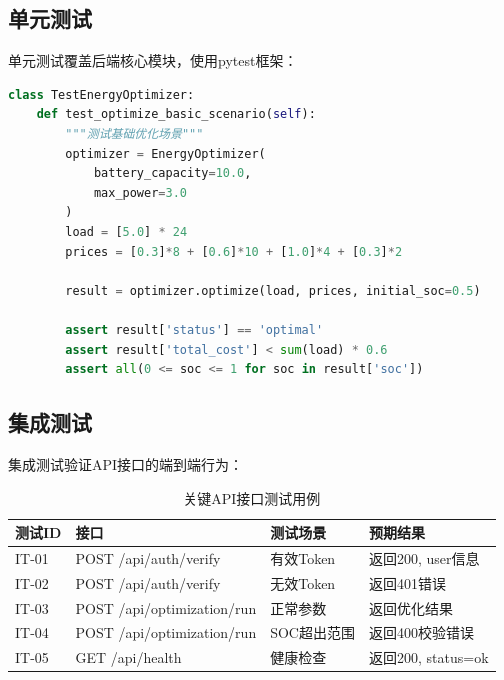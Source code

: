 \subsection{单元测试}

单元测试覆盖后端核心模块，使用pytest框架：

\begin{lstlisting}[language=Python, caption=单元测试示例]
class TestEnergyOptimizer:
    def test_optimize_basic_scenario(self):
        """测试基础优化场景"""
        optimizer = EnergyOptimizer(
            battery_capacity=10.0,
            max_power=3.0
        )
        load = [5.0] * 24
        prices = [0.3]*8 + [0.6]*10 + [1.0]*4 + [0.3]*2
        
        result = optimizer.optimize(load, prices, initial_soc=0.5)
        
        assert result['status'] == 'optimal'
        assert result['total_cost'] < sum(load) * 0.6
        assert all(0 <= soc <= 1 for soc in result['soc'])
\end{lstlisting}

\subsection{集成测试}

集成测试验证API接口的端到端行为：

\begin{table}[H]
    \centering
    \caption{关键API接口测试用例}
    \label{tab:api_tests}
    \begin{tabularx}{\textwidth}{l l l X}
        \toprule
        \textbf{测试ID} & \textbf{接口}                & \textbf{测试场景} & \textbf{预期结果}    \\
        \midrule
        IT-01         & POST /api/auth/verify      & 有效Token       & 返回200, user信息    \\
        IT-02         & POST /api/auth/verify      & 无效Token       & 返回401错误          \\
        IT-03         & POST /api/optimization/run & 正常参数          & 返回优化结果           \\
        IT-04         & POST /api/optimization/run & SOC超出范围       & 返回400校验错误        \\
        IT-05         & GET /api/health            & 健康检查          & 返回200, status=ok \\
        \bottomrule
    \end{tabularx}
\end{table}

